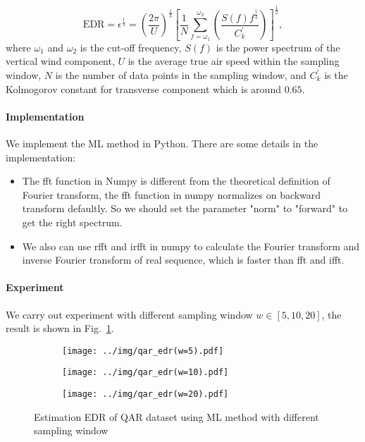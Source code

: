 \documentclass[runningheads]{llncs}
\begin{document}
\begin{equation}
    \mbox{EDR}=\epsilon^{\frac13}=\left(\frac{2\pi}{U}\right)^{\frac13}\left[\frac1N \sum_{f=\omega_1}^{\omega_2}\left(\frac{S(f)f^{\frac53}}{C^{'}_k}\right)\right]^{\frac12},
\end{equation}
where $\omega_1$ and $\omega_2$ is the cut-off frequency, $S(f)$ is the power spectrum of the vertical wind component, $U$ is the average true air speed within the sampling window, $N$ is the number of data points in the sampling window, and $C^{'}_k$ is the Kolmogorov constant for transverse component which is around $0.65$.

\paragraph{Implementation}

We implement the ML method in Python. There are some details in the implementation:

\begin{itemize}
    \item The fft function in Numpy\cite{fft} is different from the theoretical definition of Fourier transform, the fft function in numpy normalizes on backward transform defaultly. 
    So we should set the parameter "norm" to "forward" to get the right spectrum.
    \item We also can use rfft and irfft in numpy to calculate the Fourier transform and inverse Fourier transform of real sequence, which is faster than fft and ifft.
\end{itemize}

\paragraph{Experiment}

We carry out experiment with different sampling window $w \in [5,10,20]$, the result is shown in Fig.~\ref{fig:2}.

\begin{figure}[!htbp]
    \centering
    \begin{subfigure}{.4\textwidth}
        \centering
        \texttt{[image: ../img/qar\_edr(w=5).pdf]}
    \end{subfigure}
    \begin{subfigure}{.4\textwidth}
        \centering
        \texttt{[image: ../img/qar\_edr(w=10).pdf]}
    \end{subfigure}
    \begin{subfigure}{.4\textwidth}
        \centering
        \texttt{[image: ../img/qar\_edr(w=20).pdf]}
    \end{subfigure}
    \caption{Estimation EDR of QAR dataset using ML method with different sampling window}
    \label{fig:2}
\end{figure}
\end{document}
